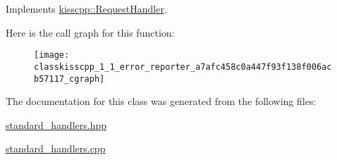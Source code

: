 Implements \hyperlink{classkisscpp_1_1_request_handler_a3606f772c07297826847a8e36226cdaa}{kisscpp\-::\-Request\-Handler}.



Here is the call graph for this function\-:\nopagebreak
\begin{figure}[H]
\begin{center}
\leavevmode
\texttt{[image: classkisscpp\_1\_1\_error\_reporter\_a7afc458c0a447f93f138f006acb57117\_cgraph]}
\end{center}
\end{figure}




The documentation for this class was generated from the following files\-:\begin{DoxyCompactItemize}
\item 
\hyperlink{standard__handlers_8hpp}{standard\-\_\-handlers.\-hpp}\item 
\hyperlink{standard__handlers_8cpp}{standard\-\_\-handlers.\-cpp}\end{DoxyCompactItemize}

